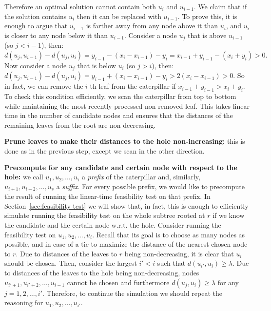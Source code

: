 \documentclass[a4paper,UKenglish]{lipics-v2016}
\newcounter{mycounter}
\newenvironment{noindlist}
 {\begin{list}{\arabic{mycounter}.~~}{\usecounter{mycounter} \labelsep=0em \labelwidth=0em \leftmargin=0em \itemindent=0em}}
 {\end{list}}
\theoremstyle{plain}
\begin{document}
\begin{noindlist}
Therefore an optimal solution cannot contain both $u_{i}$ and $u_{i-1}$. We claim that if the solution contains
$u_{i}$ then it can be replaced with $u_{i-1}$. To prove this, it is enough to argue that
$u_{i-1}$ is farther away from any node above it than $u_i$, and $u_i$ is closer to any node below it than $u_{i-1}$.
Consider a node $u_{j}$ that is above $u_{i-1}$ (so $j<i-1$), then:
$d(u_j,u_{i-1}) - d(u_j,u_{i}) = y_{i-1}-(x_i-x_{i-1})-y_i = x_{i-1}+y_{i-1}-(x_i+y_i) > 0.$
Now consider a node $u_{j}$ that is below $u_{i}$ (so $j>i$), then:
$d(u_j,u_{i-1}) - d(u_j,u_{i}) = y_{i-1}+(x_i-x_{i-1})-y_i > 2(x_i-x_{i-1}) > 0.$
So in fact, we can remove the $i$-th leaf from the caterpillar if $x_{i-1}+y_{i-1} > x_i+y_i$.
To check this condition efficiently, we scan the caterpillar from top to bottom while maintaining the most recently processed non-removed leaf.
This takes linear time in the number of candidate nodes and ensures that the distances of the
remaining leaves from the root are non-decreasing.
\item\label{making distances from the hole monotone}
\textbf{Prune leaves to make their distances to the hole non-increasing:}
this is done as in the previous step, except we scan in the other direction.
\item\label{precompute for any candidate node}
\textbf{Precompute for any candidate and certain node with respect to the hole:}
we call $u_{1},u_{2},\ldots,u_{i}$ a {\em prefix} of the caterpillar and, similarly, $u_{i+1},u_{i+2}, \ldots,u_{s}$ a {\em suffix}.
For every possible prefix, we would like to precompute the result of running the linear-time feasibility
test on that prefix. In Section~\ref{sec:feasibility test} we will show that, in fact, this is enough to efficiently
simulate running the feasibility test on the whole subtree rooted at $r$ if we know the candidate
and the certain node w.r.t. the hole. Consider running the feasibility test on $u_{1},u_{2},\ldots,u_{i}$.
Recall that its goal is to choose as many nodes as possible, and in case of a tie to maximize the distance of the
nearest chosen node to $r$. Due to distances of the leaves to $r$ being non-decreasing, it is clear that
$u_{i}$ should be chosen. Then, consider the largest $i'<i$ such that $d(u_{i'},u_{i})\geq \lambda$.
Due to distances of the leaves to the hole
being non-decreasing, nodes $u_{i'+1},u_{i'+2},\ldots,u_{i-1}$ cannot be chosen and furthermore $d(u_{j},u_{i})\geq \lambda$
for any $j=1,2,\ldots,i'$. Therefore, to continue the simulation we should repeat the reasoning for $u_{1},u_{2},\ldots,u_{i'}$.

\end{noindlist}
\end{document}
